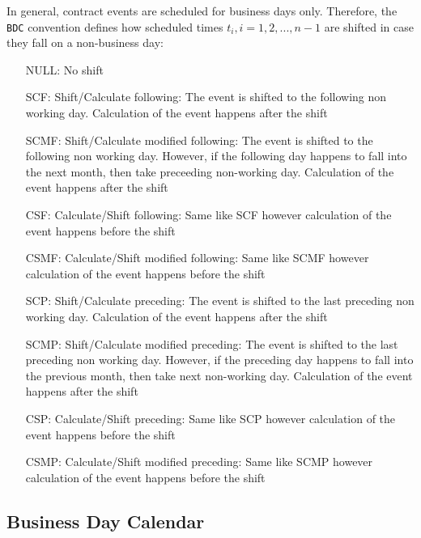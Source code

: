 \documentclass[9pt,oneside]{amsart}
\newcommand{\attr}[1]{\texttt{#1}}
\begin{document}
\begin{multicols}{2}
In general, contract events are scheduled for business days only. Therefore, the \attr{BDC} convention defines how scheduled times $t_i,i=1,2,...,n-1$ are shifted in case they fall on a non-business day:

\begin{itemize}
	\item[NULL:] No shift

	\item[SCF:] Shift/Calculate following: The event is shifted to the following non working day. Calculation of the event happens after the shift

	\item[SCMF:] Shift/Calculate modified following: The event is shifted to the following non working day. However, if the following day happens to fall into the next month, then take preceeding non-working day. Calculation of the event happens after the shift

	\item[CSF:] Calculate/Shift following: Same like SCF however calculation of the event happens before the shift

	\item[CSMF:] Calculate/Shift modified following: Same like SCMF however calculation of the event happens before the shift

	\item[SCP:] Shift/Calculate preceding: The event is shifted to the last preceding non working day. Calculation of the event happens after the shift

	\item[SCMP:] Shift/Calculate modified preceding: The event is shifted to the last preceding non working day. However, if the preceding day happens to fall into the previous month, then take next non-working day. Calculation of the event happens after the shift

	\item[CSP:] Calculate/Shift preceding: Same like SCP however calculation of the event happens before the shift

	\item[CSMP:] Calculate/Shift modified preceding: Same like SCMP however calculation of the event happens before the shift
\end{itemize}


\subsection{Business Day Calendar}\label{sec:bdcal}


\end{multicols}
\end{document}
